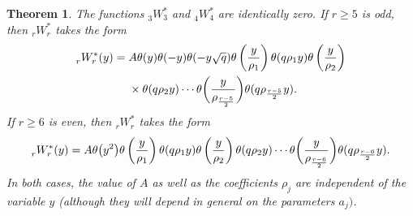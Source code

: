 \documentclass[10pt,a4paper]{amsart}
\numberwithin{equation}{section}
\newtheorem{Theorem}{Theorem}[section]
\begin{document}
\begin{Theorem} \label{thm:general_rWr_factorization}
The functions $_3^{}W_3^\ast$ and $_4^{}W_4^\ast$ are identically zero. If $r \geq 5$ is odd, then $_r^{}W_r^\ast$ takes the form
\begin{align}
_r^{}W_r^\ast(y) ={}& A \theta(y) \theta(-y) \theta(-y\sqrt{q}) \theta\left( {y \over \rho_1} \right) \theta(q\rho_1y) \theta\left( {y \over \rho_2} \right)\nonumber\\
&\times \theta(q\rho_2y) \cdots \theta\bigg( {y \over \rho_{r-5 \over 2}} \bigg) \theta(q\rho_{r-5 \over 2}y). \label{eqn:rWr_factorization_odd_case}
\end{align}
If $r \geq 6$ is even, then $_r^{}W_r^\ast$ takes the form
\begin{equation} \label{eqn:rWr_factorization_even_case}
_r^{}W_r^\ast(y) = A \theta\bigl(y^2\bigr) \theta\left( {y \over \rho_1} \right) \theta( q\rho_1y) \theta\left( {y \over \rho_2} \right) \theta(q\rho_2y) \cdots \theta\bigg( {y \over \rho_{r-6 \over 2}} \bigg) \theta( q\rho_{r-6 \over 2}y).
\end{equation}
In both cases, the value of $A$ as well as the coefficients $\rho_j$ are independent of the variable $y$ {\rm(}although they will depend in general on the parameters $a_j)$.
\end{Theorem}
\end{document}
